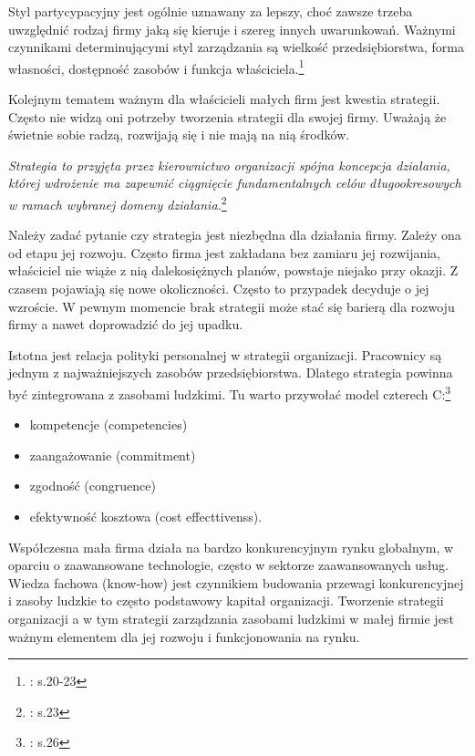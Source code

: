 Styl partycypacyjny jest ogólnie uznawany za lepszy, choć zawsze trzeba uwzględnić rodzaj firmy jaką się kieruje i szereg innych uwarunkowań. Ważnymi czynnikami determinującymi styl zarządzania są wielkość przedsiębiorstwa, forma własności, dostępność zasobów i funkcja właściciela.\footnote{\cite{msr}: s.20-23}

Kolejnym tematem ważnym dla właścicieli małych firm jest kwestia strategii. Często nie widzą oni potrzeby tworzenia strategii dla swojej firmy. Uważają że świetnie sobie radzą, rozwijają się i nie mają na nią środków.

\emph{Strategia to przyjęta przez kierownictwo organizacji spójna koncepcja działania, której wdrożenie ma zapewnić ciągnięcie fundamentalnych celów długookresowych w ramach wybranej domeny działania.}\footnote{\cite{msr}: s.23}

Należy zadać pytanie czy strategia jest niezbędna dla działania firmy. Zależy ona od etapu jej rozwoju. Często firma jest zakładana bez zamiaru jej rozwijania, właściciel nie wiąże z nią dalekosiężnych planów, powstaje niejako przy okazji. Z czasem pojawiają się nowe okoliczności. Często to przypadek decyduje o jej wzroście. W pewnym momencie brak strategii może stać się barierą dla rozwoju firmy a nawet doprowadzić do jej upadku.

Istotna jest relacja polityki personalnej w strategii organizacji. Pracownicy są jednym z najważniejszych zasobów przedsiębiorstwa. Dlatego strategia powinna być zintegrowana z zasobami ludzkimi. Tu warto przywołać model czterech C:\footnote{\cite{msr}: s.26}
\begin{itemize}
\item kompetencje (competencies)
\item zaangażowanie (commitment)
\item zgodność (congruence)
\item efektywność kosztowa (cost effecttivenss).
\end{itemize}

Współczesna mała firma działa na bardzo konkurencyjnym rynku globalnym, w oparciu o zaawansowane technologie, często w sektorze zaawansowanych usług. Wiedza fachowa (know-how) jest czynnikiem budowania przewagi konkurencyjnej i zasoby ludzkie to często podstawowy kapitał organizacji. Tworzenie strategii organizacji a w tym strategii zarządzania zasobami ludzkimi w małej firmie jest ważnym elementem dla jej rozwoju i funkcjonowania na rynku.
